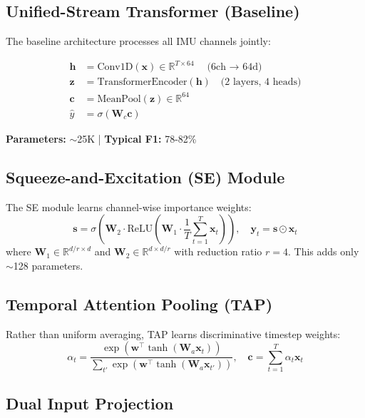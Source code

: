 \documentclass{article}
\begin{document}
\subsection{Unified-Stream Transformer (Baseline)}

The baseline architecture processes all IMU channels jointly:

\begin{align}
    \mathbf{h} &= \text{Conv1D}(\mathbf{x}) \in \mathbb{R}^{T \times 64} \quad \text{(6ch $\rightarrow$ 64d)} \\
    \mathbf{z} &= \text{TransformerEncoder}(\mathbf{h}) \quad \text{(2 layers, 4 heads)} \\
    \mathbf{c} &= \text{MeanPool}(\mathbf{z}) \in \mathbb{R}^{64} \\
    \hat{y} &= \sigma(\mathbf{W}_c \mathbf{c})
\end{align}

\textbf{Parameters:} $\sim$25K | \textbf{Typical F1:} 78-82\%

\subsection{Squeeze-and-Excitation (SE) Module}

The SE module learns channel-wise importance weights:
\begin{equation}
    \mathbf{s} = \sigma\left(\mathbf{W}_2 \cdot \text{ReLU}\left(\mathbf{W}_1 \cdot \frac{1}{T}\sum_{t=1}^{T} \mathbf{x}_t\right)\right), \quad \mathbf{y}_t = \mathbf{s} \odot \mathbf{x}_t
    \label{eq:se}
\end{equation}
where $\mathbf{W}_1 \in \mathbb{R}^{d/r \times d}$ and $\mathbf{W}_2 \in \mathbb{R}^{d \times d/r}$ with reduction ratio $r=4$. This adds only $\sim$128 parameters.

\subsection{Temporal Attention Pooling (TAP)}

Rather than uniform averaging, TAP learns discriminative timestep weights:
\begin{equation}
    \alpha_t = \frac{\exp(\mathbf{w}^\top \tanh(\mathbf{W}_a \mathbf{x}_t))}{\sum_{t'} \exp(\mathbf{w}^\top \tanh(\mathbf{W}_a \mathbf{x}_{t'}))}, \quad \mathbf{c} = \sum_{t=1}^{T} \alpha_t \mathbf{x}_t
    \label{eq:tap}
\end{equation}

\subsection{Dual Input Projection}
\end{document}

